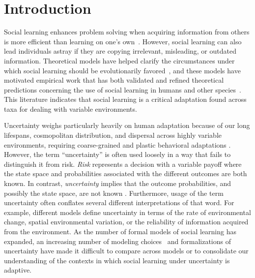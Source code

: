 \documentclass[letterpaper,11.5pt]{scrartcl}
\begin{document}
\section{Introduction}

Social learning enhances problem solving when acquiring information from others is more efficient than learning on one's own~\citep{Laland2004}. However, social learning can also lead individuals astray if they are copying irrelevant, misleading, or outdated information. Theoretical models have helped clarify the circumstances under which social learning should be evolutionarily favored~\citep{BoydRicherson1985, aoki2014evolution,Kendal2018}, and these models have motivated empirical work that has both validated and refined theoretical predictions concerning the use of social learning in humans and other species~\citep{galef2005social,McElreath2005,Kendal2018,Allen2019}. This literature
indicates that social learning is a critical adaptation found across taxa for dealing
with variable environments. %

Uncertainty weighs particularly heavily on human adaptation because of
our long lifespans, cosmopolitan distribution, and dispersal across highly variable environments, requiring coarse-grained and plastic behavioral adaptations \citep{levins1962}. However, the term ``uncertainty'' is often used loosely in a way that fails to distinguish it from risk. \emph{Risk} represents a decision with a variable payoff where the state space and probabilities associated with the different outcomes are both known. In contrast, \emph{uncertainty} implies that the outcome probabilities, and possibly the state space, are not known \citep{knight1921, keynes1921}. Furthermore, usage of the term uncertainty often conflates several different interpretations of that word. For example, different models define uncertainty in terms of the rate of environmental change, spatial environmental variation, or the reliability of information acquired from the environment. %
As the number of formal models of social learning has expanded, an increasing number of modeling choices~\citep{Kendal2018} and formalizations of
uncertainty have made it difficult to compare across models or to consolidate our
understanding of the contexts in which social learning under uncertainty is adaptive. 
\end{document}
